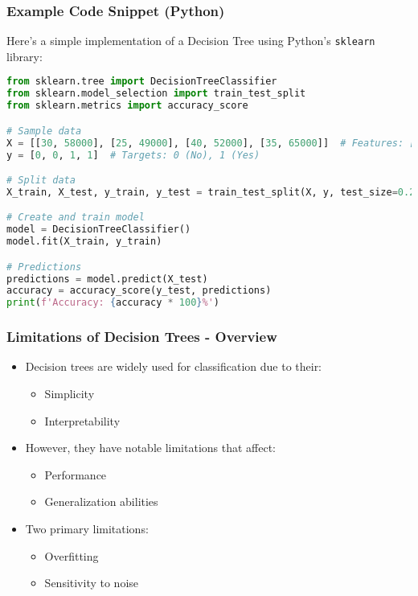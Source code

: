 \documentclass[aspectratio=169]{beamer}
\begin{document}
\begin{frame}[fragile]
    \frametitle{Example Code Snippet (Python)}
    Here’s a simple implementation of a Decision Tree using Python's \texttt{sklearn} library:
    
    \begin{lstlisting}[language=Python]
from sklearn.tree import DecisionTreeClassifier
from sklearn.model_selection import train_test_split
from sklearn.metrics import accuracy_score

# Sample data
X = [[30, 58000], [25, 49000], [40, 52000], [35, 65000]]  # Features: [Age, Income]
y = [0, 0, 1, 1]  # Targets: 0 (No), 1 (Yes)

# Split data
X_train, X_test, y_train, y_test = train_test_split(X, y, test_size=0.2)

# Create and train model
model = DecisionTreeClassifier()
model.fit(X_train, y_train)

# Predictions
predictions = model.predict(X_test)
accuracy = accuracy_score(y_test, predictions)
print(f'Accuracy: {accuracy * 100}%')
    \end{lstlisting}
\end{frame}

\begin{frame}[fragile]
    \frametitle{Limitations of Decision Trees - Overview}
    \begin{itemize}
        \item Decision trees are widely used for classification due to their:
        \begin{itemize}
            \item Simplicity
            \item Interpretability
        \end{itemize}
        \item However, they have notable limitations that affect:
        \begin{itemize}
            \item Performance
            \item Generalization abilities
        \end{itemize}
        \item Two primary limitations:
        \begin{itemize}
            \item Overfitting
            \item Sensitivity to noise
        \end{itemize}
    \end{itemize}
\end{frame}
\end{document}
